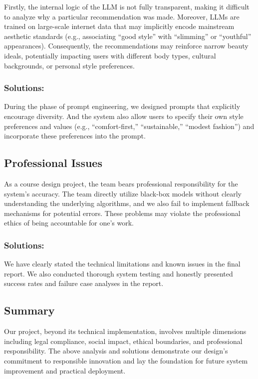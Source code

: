 Firstly, the internal logic of the LLM is not fully transparent, making it difficult to analyze why a particular recommendation was made. Moreover, LLMs are trained on large-scale internet data that may implicitly encode mainstream aesthetic standards (e.g., associating “good style” with “slimming” or “youthful” appearances). Consequently, the recommendations may reinforce narrow beauty ideals, potentially impacting users with different body types, cultural backgrounds, or personal style preferences.

\subsubsection{Solutions:}
During the phase of prompt engineering, we designed prompts that explicitly encourage diversity. And the system also allow users to specify their own style preferences and values (e.g., “comfort-first,” “sustainable,” “modest fashion”) and incorporate these preferences into the prompt.

\subsection{Professional Issues}
As a course design project, the team bears professional responsibility for the system’s accuracy. The team directly utilize black-box models without clearly understanding the underlying algorithms, and we also fail to implement fallback mechanisms for potential errors. These problems may violate the professional ethics of being accountable for one’s work.

\subsubsection{Solutions:}
We have clearly stated the technical limitations and known issues in the final report. We also conducted thorough system testing and honestly presented success rates and failure case analyses in the report. 

\subsection{Summary}
Our project, beyond its technical implementation, involves multiple dimensions including legal compliance, social impact, ethical boundaries, and professional responsibility. The above analysis and solutions demonstrate our design’s commitment to responsible innovation and lay the foundation for future system improvement and practical deployment.





